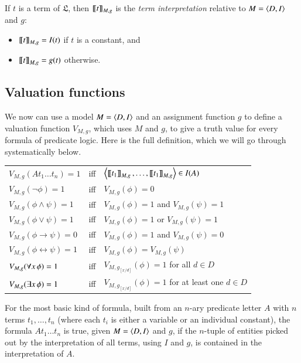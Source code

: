 \documentclass[nobib,nofonts]{tufte-handout}
\begin{document}
If $t$ is a term of $\mathfrak{L}$, then $\left [\! \left [ t \right ]\! \right]_{M,g}$ is the \emph{term interpretation} relative to $M = \left \langle D,I\right\rangle$ and $g$:
\begin{multicols}{2}
  \begin{itemize}
    \item[] $\left [\! \left [ t \right ]\! \right]_{M,g} = I(t)$ if $t$ is a constant, and
    \item[] $\left [\! \left [ t \right ]\! \right]_{M,g} = g(t)$ otherwise.
  \end{itemize}
\end{multicols}

\subsection{Valuation functions}
\label{sec:valuation--truth}

We now can use a model $M = \left \langle D, I\right\rangle$ and an assignment function $g$ to define a valuation function $V_{M,g}$, which uses $M$ and $g$, to give a truth value for every formula of predicate logic.
Here is the full definition, which we will go through systematically below.

\medskip

\begin{tabular}{lcl}
  $V_{M,g}(At_1\dots t_n) =1$ & iff & $\left \langle \left [\! \left [ t_1 \right ]\! \right]_{M,g}, \dots, \left [\! \left [ t_1 \right ]\! \right]_{M,g}\right\rangle \in I(A)$\\
  $V_{M,g}(\neg \phi) = 1$ & iff & $V_{M,g}(\phi) =0$\\
  $V_{M,g}(\phi \wedge \psi) = 1$ & iff & $V_{M,g}(\phi) =1$ and $V_{M,g}(\psi) = 1$\\
  $V_{M,g}(\phi \vee \psi) = 1$ & iff & $V_{M,g}(\phi) =1$ or $V_{M,g}(\psi) = 1$\\
  $V_{M,g}(\phi \rightarrow \psi) = 0$ & iff & $V_{M,g}(\phi) =1$ and $V_{M,g}(\psi) = 0$\\
  $V_{M,g}(\phi \leftrightarrow \psi) = 1$ & iff & $V_{M,g}(\phi) = V_{M,g}(\psi)$\\
  $V_{M,g}(\forall x \thinspace \phi) = 1$ & iff & $V_{M,g_{[x/d]}}(\phi) = 1$ for all $d \in D$\\
  $V_{M,g}(\exists x \thinspace \phi) = 1$ & iff & $V_{M,g_{[x/d]}}(\phi) = 1$ for at least one $d \in D$
\end{tabular}

\medskip

For the most basic kind of formula, built from an $n$-ary predicate letter $A$ with $n$ terms $t_{1}, \dots, t_{n}$ (where each $t_{i}$ is either a variable or an individual constant), the formula $At_1\dots t_n$ is true, given $M = \left \langle D, I\right\rangle$ and $g$, if the $n$-tuple of entities picked out by the interpretation of all terms, using $I$ and $g$, is contained in the interpretation of $A$.
\end{document}
